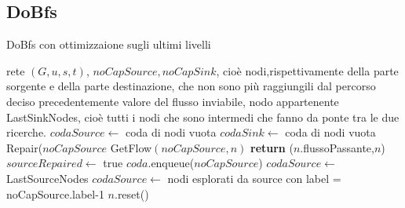 \documentclass{article}
\begin{document}
\subsection{DoBfs}
\begin{algorithm}
\caption{DoBfs con ottimizzaione sugli ultimi livelli}
\begin{algorithmic}[1]
\REQUIRE rete $(G,u,s,t)$, $noCapSource, noCapSink$, cioè nodi,rispettivamente della parte sorgente e della parte destinazione, che non sono più raggiungili dal percorso deciso precedentemente 
\ENSURE valore del flusso inviabile, nodo appartenente LastSinkNodes, cioè tutti i nodi che sono intermedi che fanno da ponte tra le due ricerche.
\STATE $codaSource \leftarrow$ coda di nodi vuota
\STATE $codaSink \leftarrow$ coda di nodi vuota
\STATE Repair($noCapSource$
\STATE GetFlow$(noCapSource,n)$ 
\STATE \textbf{return} ($n$.flussoPassante,$n$) 
\ENDIF
\ENDFOR
\ELSE
\STATE $sourceRepaired \leftarrow$ true
\ENDIF
\ENDIF
{}
\STATE $coda.$enqueue($noCapSource$)
\STATE $codaSource \leftarrow$ LastSourceNodes 
\ELSE
\STATE $codaSource \leftarrow$ nodi esplorati da source con label = noCapSource.label-1
\STATE $n.$reset()
\ENDFOR
\ENDIF
\ENDIF
{}

\end{algorithmic}
\end{algorithm}

\newpage
\end{document}
